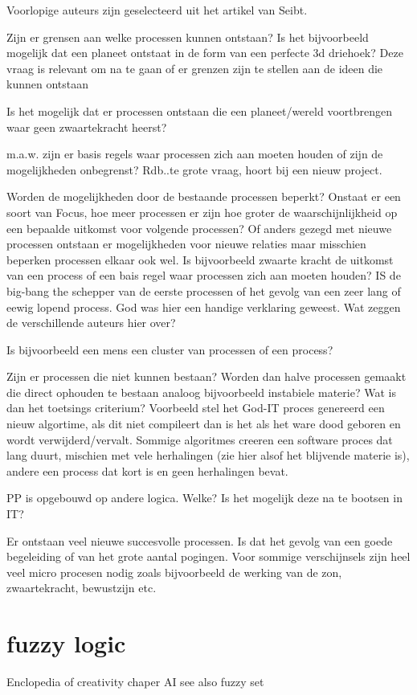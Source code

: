 \documentclass[a4paper]{Thesis}
\begin{document}
Voorlopige auteurs zijn geselecteerd uit het artikel van Seibt.

Zijn er grensen aan welke processen kunnen ontstaan? Is het bijvoorbeeld mogelijk dat een planeet ontstaat in de form van een perfecte 3d driehoek?
Deze vraag is relevant om na te gaan of er grenzen zijn te stellen aan de ideen die kunnen ontstaan

Is het mogelijk dat er processen ontstaan die een planeet/wereld voortbrengen waar geen zwaartekracht heerst?

m.a.w. zijn er basis regels waar processen zich aan moeten houden of zijn de mogelijkheden onbegrenst? 
Rdb..te grote vraag, hoort bij een nieuw project.

Worden de mogelijkheden door de bestaande processen beperkt? Onstaat er een soort van Focus, hoe meer processen er zijn hoe groter de waarschijnlijkheid op een bepaalde uitkomst voor volgende processen? Of anders gezegd met nieuwe processen ontstaan er mogelijkheden voor nieuwe relaties maar misschien beperken processen elkaar ook wel.
Is bijvoorbeeld zwaarte kracht de uitkomst van een process of een bais regel waar processen zich aan moeten houden?
IS de big-bang the schepper van de eerste processen of het gevolg van een zeer lang of eewig lopend process. God was hier een handige verklaring geweest.
Wat zeggen de verschillende auteurs hier over?

Is bijvoorbeeld een mens een cluster van processen of een process?

Zijn er processen die niet kunnen bestaan? Worden dan halve processen gemaakt die direct ophouden te bestaan analoog bijvoorbeeld instabiele materie?
Wat is dan het toetsings criterium? Voorbeeld stel het God-IT proces genereerd een nieuw algortime, als dit niet compileert dan is het als het ware dood geboren en wordt verwijderd/vervalt. Sommige algoritmes creeren een software proces dat lang duurt, mischien met vele herhalingen (zie hier alsof het blijvende materie is), andere een process dat kort is en geen herhalingen bevat.

PP is opgebouwd op andere logica. Welke? Is het mogelijk deze na te bootsen in IT?

Er ontstaan veel nieuwe succesvolle processen. Is dat het gevolg van een goede begeleiding of van het grote aantal pogingen. Voor sommige verschijnsels zijn heel veel micro procesen nodig zoals bijvoorbeeld de werking van de zon, zwaartekracht, bewustzijn etc.

\section{fuzzy logic}
Enclopedia of creativity chaper AI
see also fuzzy set
\end{document}

